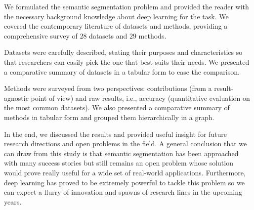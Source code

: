 We formulated the semantic segmentation problem and provided the reader with the necessary background knowledge about deep learning for the task. We covered the contemporary literature of datasets and methods, providing a comprehensive survey of $28$ datasets and $29$ methods.

Datasets were carefully described, stating their purposes and characteristics so that researchers can easily pick the one that best suits their needs. We presented a comparative summary of datasets in a tabular form to ease the comparison.

Methods were surveyed from two perspectives: contributions (from a result-agnostic point of view) and raw results, i.e., accuracy (quantitative evaluation on the most common datasets). We also presented a comparative summary of methods in tabular form and grouped them hierarchically in a graph.

In the end, we discussed the results and provided useful insight for future research directions and open problems in the field. A general conclusion that we can draw from this study is that semantic segmentation has been approached with many success stories but still remains an open problem whose solution would prove really useful for a wide set of real-world applications. Furthermore, deep learning has proved to be extremely powerful to tackle this problem so we can expect a flurry of innovation and spawns of research lines in the upcoming years.
